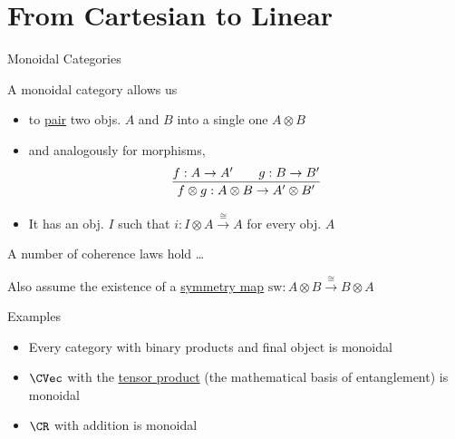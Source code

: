 \documentclass{beamer}
\begin{document}
\section{From Cartesian to Linear}

\begin{frame}{Monoidal Categories}

        A monoidal category allows us
        \begin{itemize}
                \item to \alert{\underline{pair}} two objs. $A$ and $B$ into a single one $A
                        \otimes B$ 
                \item and analogously for morphisms, \ie\
                        \[
                                \infer{
                                        f \otimes g : A \otimes B \to A' \otimes B'
                                }{
                                        f : A \to A' \qquad g : B \to B'
                                }
                        \]
                \item It has an obj. $I$ such that $i : I \otimes A \stackrel{\cong}{\to} A$ for
                        every obj. $A$
        \end{itemize}

        \medskip
        A number of coherence laws hold \dots

        Also assume the existence of a \alert{\underline{symmetry map}}
        $\mathrm{sw} : A \otimes B \stackrel{\cong}{\to} B \otimes A$
\end{frame}


\begin{frame}{Examples}
        \begin{itemize}
                \item Every category with binary products and final object is monoidal  \\[10pt]
                \item $\CVec$ with the \alert{\underline{tensor product}}
                        (the mathematical basis of entanglement) is monoidal
                        \\[10pt]
                \item $\CR$ with addition is monoidal  \\[10pt]
        \end{itemize}
\end{frame}
\end{document}
